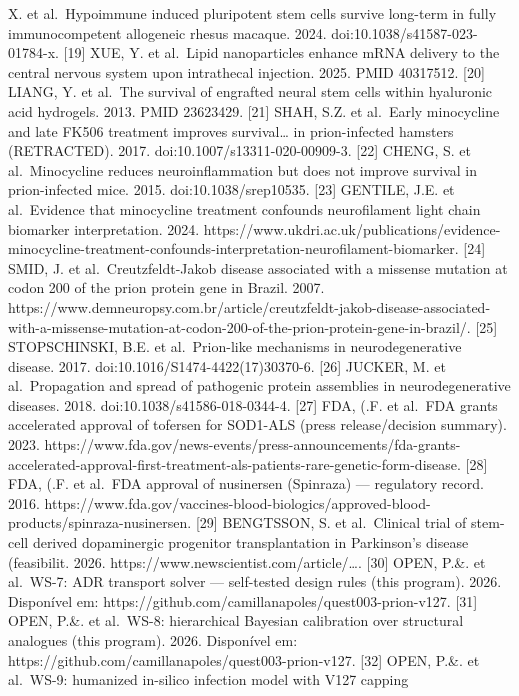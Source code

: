 \documentclass[
  10pt,
]{article}
\begin{document}
X. et al.~Hypoimmune induced pluripotent stem cells survive long-term in
fully immunocompetent allogeneic rhesus macaque. 2024.
doi:10.1038/s41587-023-01784-x. {[}19{]} XUE, Y. et al.~Lipid
nanoparticles enhance mRNA delivery to the central nervous system upon
intrathecal injection. 2025. PMID 40317512. {[}20{]} LIANG, Y. et
al.~The survival of engrafted neural stem cells within hyaluronic acid
hydrogels. 2013. PMID 23623429. {[}21{]} SHAH, S.Z. et al.~Early
minocycline and late FK506 treatment improves survival\ldots{} in
prion-infected hamsters (RETRACTED). 2017.
doi:10.1007/s13311-020-00909-3. {[}22{]} CHENG, S. et al.~Minocycline
reduces neuroinflammation but does not improve survival in
prion-infected mice. 2015. doi:10.1038/srep10535. {[}23{]} GENTILE, J.E.
et al.~Evidence that minocycline treatment confounds neurofilament light
chain biomarker interpretation. 2024.
https://www.ukdri.ac.uk/publications/evidence-minocycline-treatment-confounds-interpretation-neurofilament-biomarker.
{[}24{]} SMID, J. et al.~Creutzfeldt-Jakob disease associated with a
missense mutation at codon 200 of the prion protein gene in Brazil.
2007.
https://www.demneuropsy.com.br/article/creutzfeldt-jakob-disease-associated-with-a-missense-mutation-at-codon-200-of-the-prion-protein-gene-in-brazil/.
{[}25{]} STOPSCHINSKI, B.E. et al.~Prion-like mechanisms in
neurodegenerative disease. 2017. doi:10.1016/S1474-4422(17)30370-6.
{[}26{]} JUCKER, M. et al.~Propagation and spread of pathogenic protein
assemblies in neurodegenerative diseases. 2018.
doi:10.1038/s41586-018-0344-4. {[}27{]} FDA, (.F. et al.~FDA grants
accelerated approval of tofersen for SOD1-ALS (press release/decision
summary). 2023.
https://www.fda.gov/news-events/press-announcements/fda-grants-accelerated-approval-first-treatment-als-patients-rare-genetic-form-disease.
{[}28{]} FDA, (.F. et al.~FDA approval of nusinersen (Spinraza) ---
regulatory record. 2016.
https://www.fda.gov/vaccines-blood-biologics/approved-blood-products/spinraza-nusinersen.
{[}29{]} BENGTSSON, S. et al.~Clinical trial of stem-cell derived
dopaminergic progenitor transplantation in Parkinson's disease
(feasibilit. 2026. https://www.newscientist.com/article/\ldots. {[}30{]}
OPEN, P.\&. et al.~WS-7: ADR transport solver --- self-tested design
rules (this program). 2026. Disponível em:
https://github.com/camillanapoles/quest003-prion-v127. {[}31{]} OPEN,
P.\&. et al.~WS-8: hierarchical Bayesian calibration over structural
analogues (this program). 2026. Disponível em:
https://github.com/camillanapoles/quest003-prion-v127. {[}32{]} OPEN,
P.\&. et al.~WS-9: humanized in-silico infection model with V127 capping
\end{document}
